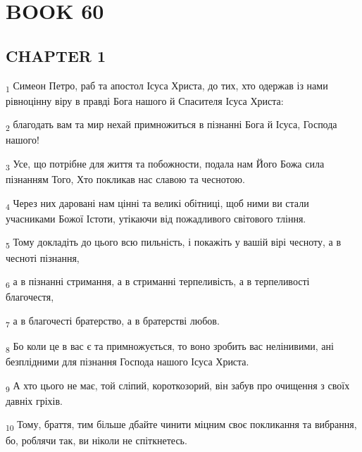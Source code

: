 \section{BOOK 60}
\subsection{CHAPTER 1}
\begin{tcolorbox}
\textsubscript{1} Симеон Петро, раб та апостол Ісуса Христа, до тих, хто одержав із нами рівноцінну віру в правді Бога нашого й Спасителя Ісуса Христа:
\end{tcolorbox}
\begin{tcolorbox}
\textsubscript{2} благодать вам та мир нехай примножиться в пізнанні Бога й Ісуса, Господа нашого!
\end{tcolorbox}
\begin{tcolorbox}
\textsubscript{3} Усе, що потрібне для життя та побожности, подала нам Його Божа сила пізнанням Того, Хто покликав нас славою та чеснотою.
\end{tcolorbox}
\begin{tcolorbox}
\textsubscript{4} Через них даровані нам цінні та великі обітниці, щоб ними ви стали учасниками Божої Істоти, утікаючи від пожадливого світового тління.
\end{tcolorbox}
\begin{tcolorbox}
\textsubscript{5} Тому докладіть до цього всю пильність, і покажіть у вашій вірі чесноту, а в чесноті пізнання,
\end{tcolorbox}
\begin{tcolorbox}
\textsubscript{6} а в пізнанні стримання, а в стриманні терпеливість, а в терпеливості благочестя,
\end{tcolorbox}
\begin{tcolorbox}
\textsubscript{7} а в благочесті братерство, а в братерстві любов.
\end{tcolorbox}
\begin{tcolorbox}
\textsubscript{8} Бо коли це в вас є та примножується, то воно зробить вас нелінивими, ані безплідними для пізнання Господа нашого Ісуса Христа.
\end{tcolorbox}
\begin{tcolorbox}
\textsubscript{9} А хто цього не має, той сліпий, короткозорий, він забув про очищення з своїх давніх гріхів.
\end{tcolorbox}
\begin{tcolorbox}
\textsubscript{10} Тому, браття, тим більше дбайте чинити міцним своє покликання та вибрання, бо, роблячи так, ви ніколи не спіткнетесь.
\end{tcolorbox}

